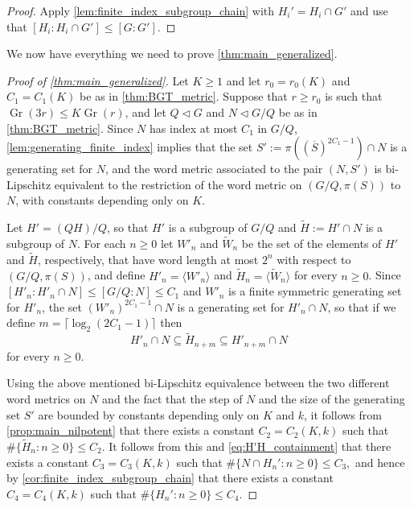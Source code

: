\documentclass[11pt]{article}
\numberwithin{equation}{section}
\theoremstyle{plain}
\theoremstyle{definition}
\theoremstyle{remark}
\numberwithin{equation}{section}
\numberwithin{equation}{section}
\newcommand{\Gr}{\operatorname{Gr}}
\begin{document}
\begin{proof}
Apply \cref{lem:finite_index_subgroup_chain} with $H_i'=H_i \cap G'$ and use that $[H_i:H_i \cap G']\leq [G:G']$.
\end{proof}



We now have everything we need to prove \cref{thm:main_generalized}.




\begin{proof}[Proof of \cref{thm:main_generalized}]
Let $K\geq 1$ and let $r_0=r_0(K)$ and $C_1=C_1(K)$ be as in \cref{thm:BGT_metric}. Suppose that $r\geq r_0$ is such that $\Gr(3r)\leq K \Gr(r)$, and let $Q \triangleleft G$ and $N \triangleleft G/Q$ be as in \cref{thm:BGT_metric}.
Since $N$ has index at most $C_1$ in $G/Q$, \cref{lem:generating_finite_index} implies that the set $S':=\pi((\overline{S})^{2C_1-1}) \cap N$ is a generating set for $N$, and the word metric associated to the pair $(N,S')$ is bi-Lipschitz equivalent to the restriction of the word metric on $(G/Q,\pi(S))$ to $N$, with constants depending only on $K$.

\medskip

Let $H'=(QH)/Q$, so that $H'$ is a subgroup of $G/Q$ and $\tilde H := H' \cap N$ is a subgroup of $N$. For each $n\geq 0$ let $W'_n$ and $\tilde W_n$ be the set of the elements of $H'$ and $\tilde H$, respectively, that have word length at most $2^n$ with respect to $(G/Q,\pi(S))$, and define $H'_n= \langle W'_n \rangle$ and $\tilde H_n=\langle \tilde W_n \rangle$ for every $n\geq 0$. Since $[H'_n:H'_n \cap N]\leq [G/Q:N]\leq C_1$ and $W'_n$ is a finite symmetric generating set for $H'_n$, the set $(W'_n)^{2C_1-1}\cap N$ is a generating set for $H'_n \cap N$, so that if we define $m=\lceil \log_2 (2C_1-1) \rceil$ then
\begin{equation}
\label{eq:H'H_containment}
H'_n \cap N \subseteq \tilde H_{n+m} \subseteq H'_{n+m} \cap N
\end{equation}
for every $n\geq 0$.

\medskip


   Using the above mentioned bi-Lipschitz equivalence between the two different word metrics on $N$ and the fact that the step of $N$ and the size of the generating set $S'$ are bounded by constants depending only on $K$ and $k$, it follows from \cref{prop:main_nilpotent} that there exists a constant $C_2=C_2(K,k)$ such that
$
\#\{\tilde H_n : n \geq 0 \} \leq C_2.
$
It follows from this and \eqref{eq:H'H_containment} that there 
%
exists a constant $C_3=C_3(K,k)$ such that
$
\#\{N\cap H_n' : n \geq 0 \} \leq C_3,
$
and hence by \cref{cor:finite_index_subgroup_chain} that there exists a constant $C_4=C_4(K,k)$ such that
$
\#\{ H_n' : n \geq 0 \} \leq C_4.
$


\end{proof}
\end{document}
